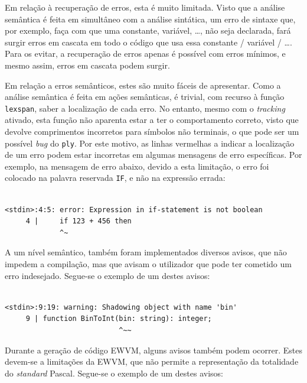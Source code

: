 \documentclass[12pt, a4paper]{article}
\begin{document}
Em relação à recuperação de erros, esta é muito limitada. Visto que a análise semântica é feita em
simultâneo com a análise sintática, um erro de sintaxe que, por exemplo, faça com que uma constante,
variável, \ldots, não seja declarada, fará surgir erros em cascata em todo o código que usa essa
constante / variável / \ldots. Para os evitar, a recuperação de erros apenas é possível com erros
mínimos, e mesmo assim, erros em cascata podem surgir.

Em relação a erros semânticos, estes são muito fáceis de apresentar. Como a análise semântica é
feita em ações semânticas, é trivial, com recurso à função \texttt{lexspan}, saber a localização de
cada erro. No entanto, mesmo com o \emph{tracking} ativado, esta função não aparenta estar a ter o
comportamento correto, visto que devolve comprimentos incorretos para símbolos não terminais, o que
pode ser um possível \emph{bug} do \texttt{ply}. Por este motivo, as linhas vermelhas a indicar a
localização de um erro podem estar incorretas em algumas mensagens de erro específicas. Por exemplo,
na mensagem de erro abaixo, devido a esta limitação, o erro foi colocado na palavra reservada
\texttt{IF}, e não na expressão errada:

\begin{lstlisting}

<stdin>:4:5: error: Expression in if-statement is not boolean
     4 |     if 123 + 456 then
             ^~
\end{lstlisting}

A um nível semântico, também foram implementados diversos avisos, que não impedem a compilação, mas
que avisam o utilizador que pode ter cometido um erro indesejado. Segue-se o exemplo de um destes
avisos:


\begin{lstlisting}

<stdin>:9:19: warning: Shadowing object with name 'bin'
     9 | function BinToInt(bin: string): integer;
                           ^~~
\end{lstlisting}

Durante a geração de código EWVM, alguns avisos também podem ocorrer. Estes devem-se a limitações da
EWVM, que não permite a representação da totalidade do \emph{standard} Pascal. Segue-se o exemplo de
um destes avisos:
\end{document}
